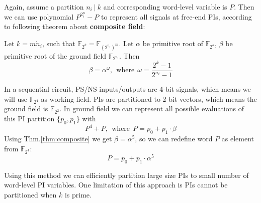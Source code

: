 Again, assume a partition $n_i~|~k$ and corresponding word-level variable is $P$. Then we can use polynomial
$P^{2^n_i}-P$ to represent all signals at free-end PIs, according to following theorem about {\bf composite
field}:
\begin{Theorem}
\label{thm:composite}
Let $k = m\dot n_i$, such that $\mathbb F_{2^k} = \mathbb F_{(2^{n_i})^m}$. Let $\alpha$ be primitive root of 
$\mathbb F_{2^k}$, $\beta$ be primitive root of the ground field $\mathbb F_{2^{n_i}}$. Then
$$\beta = \alpha^\omega,~~\text{where}~~\omega = \frac{2^k-1}{2^{n_i}-1}$$
\end{Theorem}
\begin{Example}
In a sequential circuit, PS/NS inputs/outputs are 4-bit signals, which means we will use $\mathbb F_{2^4}$
as working field. PIs are partitioned to 2-bit vectors, which means the ground field is $\mathbb F_{2^2}$.
In ground field we can represent all possible evaluations of this PI partition $\{p_0,p_1\}$ with
$$P^4+P,~~\text{where}~~P=p_0+p_1\cdot\beta$$
Using Thm.\ref{thm:composite} we get $\beta = \alpha^5$, so we can redefine word $P$ as element from $\mathbb F_{2^4}$:
$$P = p_0 + p_1\cdot\alpha^5$$
\end{Example}
Using this method we can efficiently partition large size PIs to small number of word-level PI variables.
One limitation of this approach is PIs cannot be partitioned when $k$ is prime.